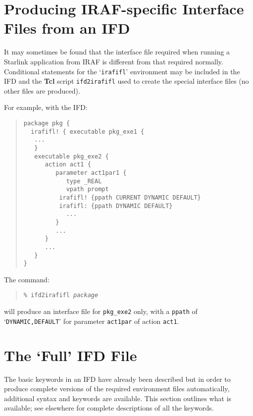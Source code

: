 \documentclass[twoside,11pt]{article}
\newcommand{\htmlref}[2]{#1}
\newcommand{\xlabel}[1]{}
\begin{document}
\section{\label{ifd2irafifl}\xlabel{producing_irafspecific_interface_files_from_an_ifd}Producing 
IRAF-specific Interface Files from an IFD}
It may sometimes be found that the interface file required when running a
Starlink application from IRAF is different from that required normally.
\htmlref{Conditional statements}{conditional_sections} for the `\texttt{irafifl}' environment may be 
included in the IFD and the \textbf{Tcl} script \texttt{ifd2irafifl} used to 
create the special interface files (no other files are produced).

For example, with the IFD:
\begin{quote} \begin{verbatim}
package pkg {
  irafifl! { executable pkg_exe1 {
   ...
   }
   executable pkg_exe2 {
      action act1 {
         parameter act1par1 {
            type _REAL
            vpath prompt
          irafifl! {ppath CURRENT DYNAMIC DEFAULT}
          irafifl: {ppath DYNAMIC DEFAULT}
            ...
         }
         ...
      }
      ...
   }
}
\end{verbatim} \end{quote}
The command:
\begin{quote} 
\texttt{\% ifd2irafifl \textit{package}}
\end{quote}
will produce an interface file for \texttt{pkg\_exe2} only, with a 
\texttt{ppath} of `\texttt{DYNAMIC,DEFAULT}' for parameter \texttt{act1par} of 
action \texttt{act1}.

\section{\xlabel{the_full_ifd_file}\label{IFD_file}The `Full' IFD File}
The basic keywords in an IFD have already been described but in order to 
produce complete versions of the required environment files automatically, 
additional syntax and keywords are available.
This section outlines what is available; see elsewhere
 for 
\htmlref{complete descriptions}{keywords} of all the keywords.
\end{document}
